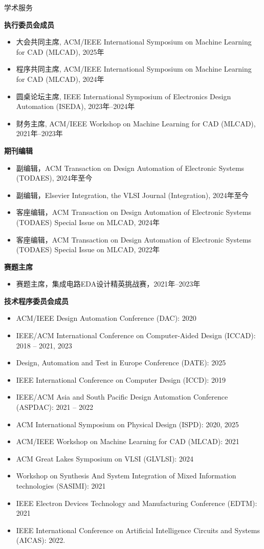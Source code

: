 
\begin{rSection}{学术服务}

\textbf{执行委员会成员}
\begin{itemize}
    \item 大会共同主席, ACM/IEEE International Symposium on Machine Learning for CAD (MLCAD), 2025年
    \item 程序共同主席, ACM/IEEE International Symposium on Machine Learning for CAD (MLCAD), 2024年
    \item 圆桌论坛主席, IEEE International Symposium of Electronics Design Automation (ISEDA), 2023年--2024年
    \item 财务主席, ACM/IEEE Workshop on Machine Learning for CAD (MLCAD), 2021年--2023年 
\end{itemize}

\textbf{期刊编辑}
\begin{itemize}
    \item 副编辑，ACM Transaction on Design Automation of Electronic Systems (TODAES), 2024年至今
    \item 副编辑，Elsevier Integration, the VLSI Journal (Integration), 2024年至今
    \item 客座编辑，ACM Transaction on Design Automation of Electronic Systems (TODAES) Special Issue on MLCAD, 2024年
    \item 客座编辑，ACM Transaction on Design Automation of Electronic Systems (TODAES) Special Issue on MLCAD, 2022年
\end{itemize}

\textbf{赛题主席}
\begin{itemize}
    \item 赛题主席，集成电路EDA设计精英挑战赛，2021年--2023年
\end{itemize}

\textbf{技术程序委员会成员}
\begin{itemize}
    \item ACM/IEEE Design Automation Conference (DAC): 2020
    \item IEEE/ACM International Conference on Computer-Aided Design (ICCAD): 2018 -- 2021, 2023
    \item Design, Automation and Test in Europe Conference (DATE): 2025
    \item IEEE International Conference on Computer Design (ICCD): 2019
    \item IEEE/ACM Asia and South Pacific Design Automation Conference (ASPDAC): 2021 -- 2022
    \item ACM International Symposium on Physical Design (ISPD): 2020, 2025
    \item ACM/IEEE Workshop on Machine Learning for CAD (MLCAD): 2021
    \item ACM Great Lakes Symposium on VLSI (GLVLSI): 2024
    \item Workshop on Synthesis And System Integration of Mixed Information technologies (SASIMI): 2021
    \item IEEE Electron Devices Technology and Manufacturing Conference (EDTM): 2021
    \item IEEE International Conference on Artificial Intelligence Circuits and Systems (AICAS): 2022. 
\end{itemize}


\end{rSection}
